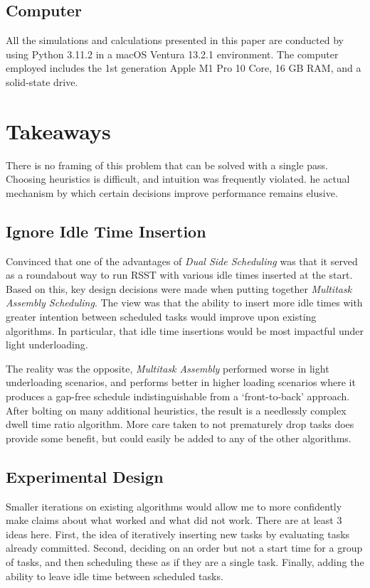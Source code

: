 \documentclass[journal,12pt,onecolumn,draftclsnofoot,]{IEEEtran}
\begin{document}
\subsection{Computer}

All the simulations and calculations presented in this paper are conducted by using Python 3.11.2 in a macOS Ventura 13.2.1 environment.
The computer employed includes the 1st generation Apple M1 Pro 10 Core, 16 GB RAM, and a solid-state drive.

\section{Takeaways}

There is no framing of this problem that can be solved with a single pass.
Choosing heuristics is difficult, and intuition was frequently violated.
he actual mechanism by which certain decisions improve performance remains elusive.

\subsection{Ignore Idle Time Insertion}

Convinced that one of the advantages of \emph{Dual Side Scheduling} was that it served as a roundabout way to run RSST with various idle times inserted at the start.
Based on this, key design decisions were made when putting together \emph{Multitask Assembly Scheduling}.
The view was that the ability to insert more idle times with greater intention between scheduled tasks would improve upon existing algorithms.
In particular, that idle time insertions would be most impactful under light underloading.

The reality was the opposite, \emph{Multitask Assembly} performed worse in light underloading scenarios, and performs better in higher loading scenarios where it produces a gap-free schedule indistinguishable from a `front-to-back' approach.
After bolting on many additional heuristics, the result is a needlessly complex dwell time ratio algorithm.
More care taken to not prematurely drop tasks does provide some benefit, but could easily be added to any of the other algorithms.

\subsection{Experimental Design}

Smaller iterations on existing algorithms would allow me to more confidently make claims about what worked and what did not work.
There are at least 3 ideas here.
First, the idea of iteratively inserting new tasks by evaluating tasks already committed.
Second, deciding on an order but not a start time for a group of tasks, and then scheduling these as if they are a single task.
Finally, adding the ability to leave idle time between scheduled tasks.
\end{document}

